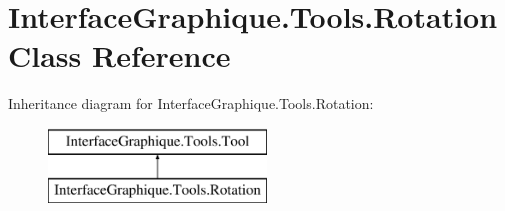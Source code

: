 \hypertarget{class_interface_graphique_1_1_tools_1_1_rotation}{}\section{Interface\+Graphique.\+Tools.\+Rotation Class Reference}
\label{class_interface_graphique_1_1_tools_1_1_rotation}
Inheritance diagram for Interface\+Graphique.\+Tools.\+Rotation\+:\begin{figure}[H]
\begin{center}
\leavevmode
\includegraphics[height=2.000000cm]{class_interface_graphique_1_1_tools_1_1_rotation}
\end{center}
\end{figure}
